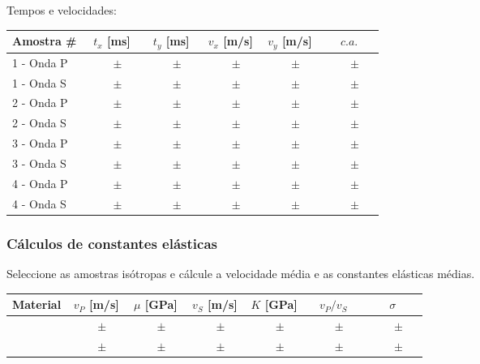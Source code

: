 \documentclass[a4paper,12pt]{article}  %
\begin{document}
Tempos e velocidades:
\begin{center}
	\begin{tabular}{|l|c|c|c|c|c|	}
	\hline
	  Amostra \# &   $t_x$ [ms]  &   $t_y$ [ms]  &   $v_x$ [m/s] & $v_y$ [m/s] &  
	  $c.a.$	\\
	\hline \hline
	  1 - Onda P   & $ \quad \quad \pm \quad $  & $ \quad \quad\pm \quad $ & $ \quad \quad\pm \quad $ & $ \quad\quad \pm \quad $ & $ \quad \quad\pm \quad $ \\ \hline
	  1 - Onda S   & $ \quad \quad \pm \quad $  & $ \quad \quad\pm \quad $ & $ \quad \quad\pm \quad $ & $ \quad\quad \pm \quad $ & $ \quad \quad\pm \quad $ \\ \hline
	  2 - Onda P   & $ \quad \quad\pm \quad $  & $ \quad \quad\pm \quad $ & $ \quad \quad\pm \quad $ & $ \quad\quad \pm \quad $ & $ \quad \quad\pm \quad $ \\ \hline
	  2 - Onda S   & $ \quad \quad\pm \quad $  & $ \quad \quad\pm \quad $ & $ \quad \quad\pm \quad $ & $ \quad\quad \pm \quad $ & $ \quad \quad\pm \quad $ \\ \hline
	  3 - Onda P   & $ \quad \quad\pm \quad $  & $ \quad \quad\pm \quad $ & $ \quad \quad\pm \quad $ & $ \quad\quad \pm \quad $ & $ \quad \quad\pm \quad $ \\ \hline
	  3 - Onda S   & $ \quad \quad\pm \quad $  & $ \quad \quad\pm \quad $ & $ \quad \quad\pm \quad $ & $ \quad\quad \pm \quad $ & $ \quad \quad\pm \quad $ \\ \hline
	  4 - Onda P   & $ \quad \quad\pm \quad $  & $ \quad \quad\pm \quad $ & $ \quad \quad\pm \quad $ & $ \quad\quad \pm \quad $ & $ \quad \quad\pm \quad $ \\ \hline
	  4 - Onda S   & $ \quad \quad\pm \quad $  & $ \quad \quad\pm \quad $ & $ \quad \quad\pm \quad $ & $ \quad\quad \pm \quad $ & $ \quad \quad\pm \quad $ \\ \hline
 	\end{tabular}
\end{center}

\subsubsection{\sf Cálculos de constantes elásticas}%
Seleccione as amostras isótropas e cálcule a velocidade média e as constantes elásticas médias. 

\begin{center}
	\begin{tabular}{|l|c|c|c|c|c|c|}
	\hline
	  Material &   $v_P$ [m/s]  &   $\mu$ [GPa]  &  $v_S$ [m/s] & $K$ [GPa] & $v_P/v_S$  &  $\sigma$  	\\
	\hline \hline
	    & $ \quad \quad \pm \quad $ &  $ \quad \quad \pm \quad $ & $ \quad \quad \pm \quad $ & $ \quad \quad \pm \quad $ & $ \quad \quad  \pm \quad $ & $ \quad \quad \pm \quad $ \\ \hline
 	     & $ \quad \quad \pm \quad $ &  $ \quad \quad  \pm \quad $ & $ \quad \quad \pm \quad $ & $ \quad \quad \pm \quad $ & $ \quad \quad \pm \quad $ & $ \quad \quad \pm \quad $ \\ \hline
 	\end{tabular}
\end{center}
\end{document}
